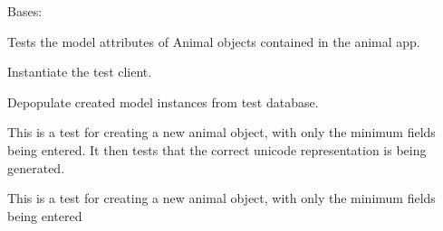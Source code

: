 \documentclass[letterpaper,10pt,english]{sphinxmanual}
\begin{document}
\begin{fulllineitems}
\label{api:mousedb.animal.tests.AnimalModelTests}
Bases: 

Tests the model attributes of Animal objects contained in the animal app.


\begin{fulllineitems}
\label{api:mousedb.animal.tests.AnimalModelTests.setUp}
Instantiate the test client.

\end{fulllineitems}



\begin{fulllineitems}
\label{api:mousedb.animal.tests.AnimalModelTests.tearDown}
Depopulate created model instances from test database.

\end{fulllineitems}



\begin{fulllineitems}
\label{api:mousedb.animal.tests.AnimalModelTests.test_animal_unicode}
This is a test for creating a new animal object, with only the minimum fields being entered.  It then tests that the correct unicode representation is being generated.

\end{fulllineitems}



\begin{fulllineitems}
\label{api:mousedb.animal.tests.AnimalModelTests.test_create_animal_minimal}
This is a test for creating a new animal object, with only the minimum fields being entered

\end{fulllineitems}


\end{fulllineitems}
\end{document}
